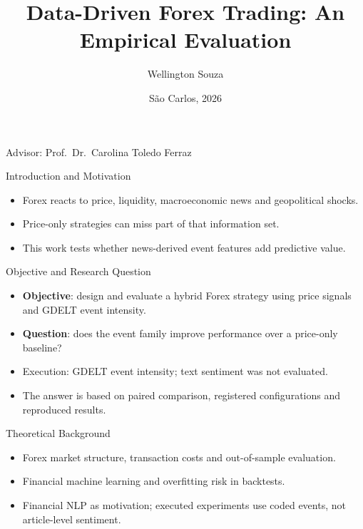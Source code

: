 \documentclass[aspectratio=169,17pt]{beamer}
\title[Data-Driven Forex Trading]{Data-Driven Forex Trading: An Empirical Evaluation}
\author[Wellington Souza]{Wellington Souza}
\institute[ICMC/USP]{MBA in Artificial Intelligence and Big Data \\ ICMC, University of S\~ao Paulo}
\date{S\~ao Carlos, 2026}
\begin{document}
\begin{frame}
  \titlepage
  \vspace{-0.6cm}
  \begin{center}
    \small Advisor: Prof.\ Dr.\ Carolina Toledo Ferraz
  \end{center}
\end{frame}

\begin{frame}{Introduction and Motivation}
  \begin{itemize}
    \item Forex reacts to price, liquidity, macroeconomic news and geopolitical shocks.
    \item Price-only strategies can miss part of that information set.
    \item This work tests whether news-derived event features add predictive value.
  \end{itemize}
\end{frame}

\begin{frame}{Objective and Research Question}
  \small
  \begin{itemize}
    \item \textbf{Objective}: design and evaluate a hybrid Forex strategy using price signals and GDELT event intensity.
    \item \textbf{Question}: does the event family improve performance over a price-only baseline?
    \item Execution: GDELT event intensity; text sentiment was not evaluated.
    \item The answer is based on paired comparison, registered configurations and reproduced results.
  \end{itemize}
\end{frame}

\begin{frame}{Theoretical Background}
  \begin{itemize}
    \item Forex market structure, transaction costs and out-of-sample evaluation.
    \item Financial machine learning and overfitting risk in backtests.
    \item Financial NLP as motivation; executed experiments use coded events, not article-level sentiment.
  \end{itemize}
\end{frame}
\end{document}
